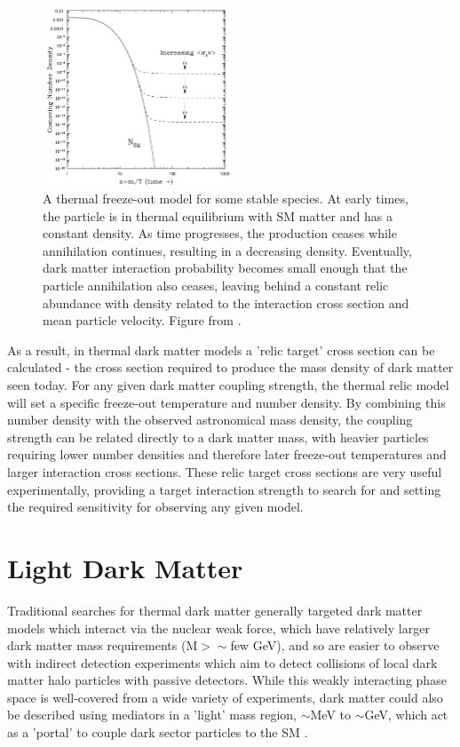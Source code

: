 \begin{figure}
	\label{fig:freezeout}
	\centering
	\includegraphics[width=0.5\textwidth]{figures/thermal_relic.png}
	\caption[Thermal Freeze-Out]{A thermal freeze-out model for some stable species. At early times, the particle is in thermal equilibrium with SM matter and has a constant density. As time progresses, the production ceases while annihilation continues, resulting in a decreasing density. Eventually, dark matter interaction probability becomes small enough that the particle annihilation also ceases, leaving behind a constant relic abundance with density related to the interaction cross section and mean particle velocity. Figure from \cite{hooper2009tasi}.}
\end{figure}

As a result, in thermal dark matter models a 'relic target' cross section can be calculated - the cross section required to produce the mass density of dark matter seen today.
For any given dark matter coupling strength, the thermal relic model will set a specific freeze-out temperature and number density.
By combining this number density with the observed astronomical mass density, the coupling strength can be related directly to a dark matter mass, with heavier particles requiring lower number densities and therefore later freeze-out temperatures and larger interaction cross sections.
These relic target cross sections are very useful experimentally, providing a target interaction strength to search for and setting the required sensitivity for observing any given model.

\section{Light Dark Matter}
Traditional searches for thermal dark matter generally targeted dark matter models which interact via the nuclear weak force, which have relatively larger dark matter mass requirements (M$>\sim$few GeV), and so are easier to observe with indirect detection experiments which aim to detect collisions of local dark matter halo particles with passive detectors.
While this weakly interacting phase space is well-covered from a wide variety of experiments, dark matter could also be described using mediators in a 'light' mass region, $\sim$MeV to $\sim$GeV, which act as a 'portal' to couple dark sector particles to the SM \cite{darkSectors}.

